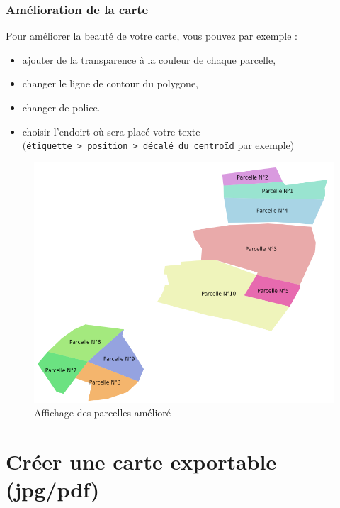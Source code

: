 \hypertarget{amuxe9lioration-de-la-carte}{%
\subsubsection{Amélioration de la
carte}\label{amuxe9lioration-de-la-carte}}

Pour améliorer la beauté de votre carte, vous pouvez par exemple :

\begin{itemize}
\tightlist
\item
  ajouter de la transparence à la couleur de chaque parcelle,
\item
  changer le ligne de contour du polygone,
\item
  changer de police.
\item
  choisir l'endoirt où sera placé votre texte
  (\texttt{étiquette\ \textgreater{}\ position\ \textgreater{}\ décalé\ du\ centroïd}
  par exemple)
\end{itemize}

\begin{figure}
\centering
\includegraphics{figures/parcelle_style.png}
\caption{Affichage des parcelles amélioré}
\end{figure}

\hypertarget{cruxe9er-une-carte-exportable-jpgpdf}{%
\section{Créer une carte exportable
(jpg/pdf)}\label{cruxe9er-une-carte-exportable-jpgpdf}}

